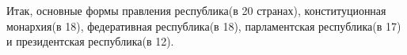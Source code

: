
Итак, основные формы правления республика(в 20 странах), конституционная монархия(в 18), федеративная республика(в 18), парламентская республика(в 17) и президентская республика(в 12).